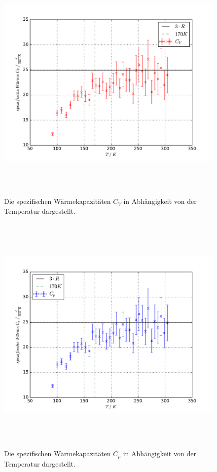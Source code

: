 \begin{figure}
  \centering
  \includegraphics[height = 12cm]{plots/Cplot1.pdf}
  \caption{Die spezifischen Wärmekapazitäten \texorpdfstring{$C_V$}{math} in Abhängigkeit von der Temperatur dargestellt.}
  \label{fig:CVP1}
\end{figure}
\begin{figure}
  \centering
  \includegraphics[height = 12cm]{plots/Cplot2.pdf}
  \caption{Die spezifischen Wärmekapazitäten \texorpdfstring{$C_p$}{math} in Abhängigkeit von der Temperatur dargestellt.}
  \label{fig:CVP2}
\end{figure}


